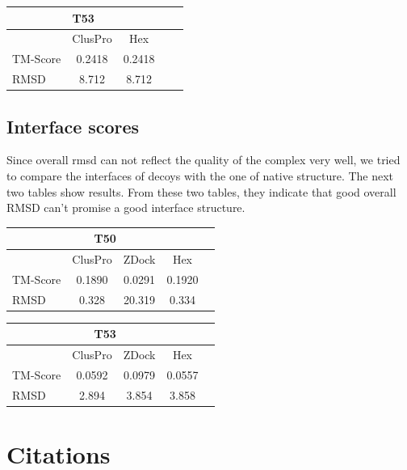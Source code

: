 \documentclass{article}
\begin{document}
\begin{center}
\begin{tabular}{|l|c|c|c|r|}
\multicolumn{3}{c}{T53} \\
    \hline
      & ClusPro & Hex \\ \hline
    TM-Score & 0.2418 & 0.2418 \\ \hline
    RMSD & 8.712 & 8.712 \\
    \hline
    \end{tabular}
\end{center}


\subsection{Interface scores}

Since overall rmsd can not reflect the quality of the complex very well, we tried to compare the interfaces of decoys with the one of native structure. The next two tables show results. From these two tables, they indicate that good overall RMSD can’t promise a good interface structure.


\begin{center}
\begin{tabular}{|l|c|c|c|r|}
\multicolumn{4}{c}{T50} \\
    \hline
      & ClusPro & ZDock & Hex \\ \hline
    TM-Score & 0.1890 & 0.0291 & 0.1920 \\ \hline
    RMSD & 0.328 & 20.319 & 0.334 \\
    \hline
    \end{tabular}
\end{center}


\begin{center}
\begin{tabular}{|l|c|c|c|r|}
\multicolumn{4}{c}{T53} \\
    \hline
      & ClusPro & ZDock & Hex \\ \hline
    TM-Score & 0.0592 & 0.0979 & 0.0557 \\ \hline
    RMSD & 2.894 & 3.854 & 3.858 \\
    \hline
    \end{tabular}
\end{center}





\section{Citations}
\end{document}
